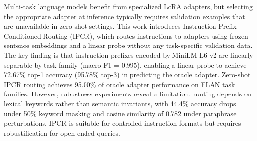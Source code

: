 
Multi-task language models benefit from specialized LoRA adapters, but selecting the appropriate adapter at inference typically requires validation examples that are unavailable in zero-shot settings. This work introduces Instruction-Prefix-Conditioned Routing (IPCR), which routes instructions to adapters using frozen sentence embeddings and a linear probe without any task-specific validation data. The key finding is that instruction prefixes encoded by MiniLM-L6-v2 are linearly separable by task family (macro-F1 = 0.995), enabling a linear probe to achieve 72.67\% top-1 accuracy (95.78\% top-3) in predicting the oracle adapter. Zero-shot IPCR routing achieves 95.00\% of oracle adapter performance on FLAN task families. However, robustness experiments reveal a limitation: routing depends on lexical keywords rather than semantic invariants, with 44.4\% accuracy drops under 50\% keyword masking and cosine similarity of 0.782 under paraphrase perturbations. IPCR is suitable for controlled instruction formats but requires robustification for open-ended queries.
